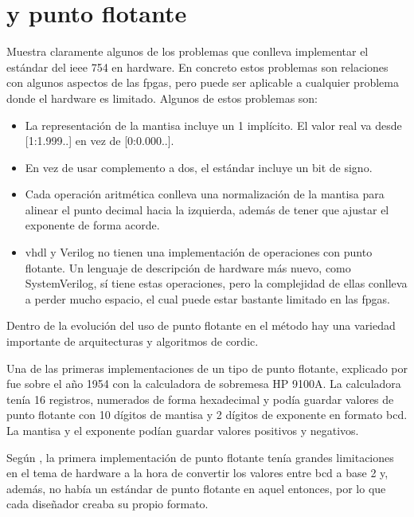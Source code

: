 \section{ y punto flotante}

\cite{parker_abstract_2011} Muestra claramente algunos de los problemas que conlleva implementar el estándar del \gls{ieee} 754 en hardware. En concreto estos problemas son relaciones con algunos aspectos de las \gls{fpga}s, pero puede ser aplicable a cualquier problema donde el hardware es limitado. Algunos de estos problemas son:

\begin{itemize}
	\item La representación de la mantisa incluye un 1 implícito. El valor real va desde [1:1.999..] en vez de [0:0.000..]. 
	\item En vez de usar complemento a dos, el estándar incluye un bit de signo.
	\item Cada operación aritmética conlleva una normalización de la mantisa para alinear el punto decimal hacia la izquierda, además de tener que ajustar el exponente de forma acorde.
	\item \gls{vhdl} y Verilog no tienen una implementación de operaciones con punto flotante. Un lenguaje de descripción de hardware más nuevo, como SystemVerilog, sí tiene estas operaciones, pero la complejidad de ellas conlleva a perder mucho espacio, el cual puede estar bastante limitado en las \gls{fpga}s.
\end{itemize}

Dentro de la evolución del uso de punto flotante en el método hay una variedad importante de arquitecturas y algoritmos de \gls{cordic}.

Una de las primeras implementaciones de un tipo de punto flotante, explicado por \cite{leibson_9100_2005} fue sobre el año 1954 con la calculadora de sobremesa HP 9100A. La calculadora tenía 16 registros, numerados de forma hexadecimal y podía guardar valores de punto flotante con 10 dígitos de mantisa y 2 dígitos de exponente en formato \gls{bcd}. La mantisa y el exponente podían guardar valores positivos y negativos.

Según \cite{walther_unified_1971}, la primera implementación de punto flotante tenía grandes limitaciones en el tema de hardware a la hora de convertir los valores entre \gls{bcd} a base 2 y, además, no había un estándar de punto flotante en aquel entonces, por lo que cada diseñador creaba su propio formato.

